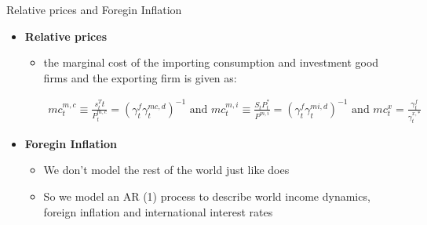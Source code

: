 \documentclass[9pt]{beamer}
\let\olditem\item
\renewcommand{\item}{%
\olditem\vspace{\fill}}
\begin{document}
\begin{frame}{Relative prices and Foregin Inflation}
\begin{itemize}
   \item \textbf{Relative prices}
   \begin{itemize}
        \item the marginal cost of the importing consumption and investment good firms and the exporting firm is given as:
        
        $$\begin{array}{l}
        m c_{t}^{m, c} \equiv \frac{s_{t}^{T} t}{P_{t}^{m, c}}=\left(\gamma_{t}^{f} \gamma_{t}^{m c, d}\right)^{-1} \text{ and }
        m c_{t}^{m, i} \equiv \frac{S_{t} P_{t}^{*}}{P^{m, i}}=\left(\gamma_{t}^{f} \gamma_{t}^{m i, d}\right)^{-1} \text{ and }
        m c_{t}^{x}=\frac{\gamma_{t}^{f}}{\gamma_{t}^{x, *}}
        \end{array}$$
        
   \end{itemize}
   \item \textbf{Foregin Inflation}
    \begin{itemize}
        \item We don't model the rest of the world just like \textcolor{red}{\citet{Castro:2015}} does
        
        \item So we model an AR (1) process to describe world income dynamics, foreign inflation and international interest rates
    
    \end{itemize} 

\end{itemize}

\end{frame}




















%
%

%
%
\end{document}
